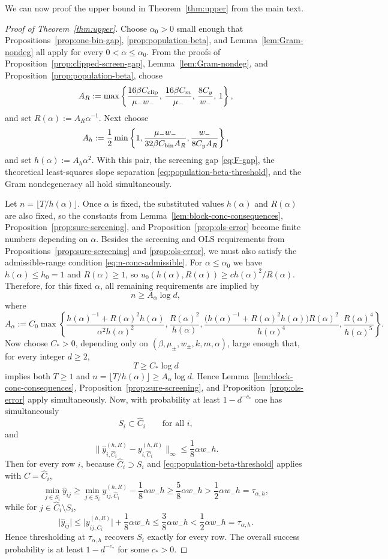 \documentclass{article}
\newcommand{\norm}[1]{\lVert #1\rVert}
\newcommand{\abs}[1]{\lvert #1\rvert}
\begin{document}
We can now proof the upper bound in Theorem~\ref{thm:upper} from the main text.
\begin{proof}[Proof of Theorem~\ref{thm:upper}]
Choose $\alpha_0>0$ small enough that Propositions~\ref{prop:one-bin-gap}, \ref{prop:population-beta}, and Lemma~\ref{lem:Gram-nondeg} all apply for every $0<\alpha\le \alpha_0$. From the proofs of Proposition~\ref{prop:clipped-screen-gap}, Lemma~\ref{lem:Gram-nondeg}, and Proposition~\ref{prop:population-beta}, choose
\[
A_R:=\max\left\{\frac{16\beta C_{\rm clip}}{\mu_-w_-},\,\frac{16\beta C_m}{\mu_-},\,\frac{8C_y}{w_-},\,1\right\},
\]
and set $R(\alpha):=A_R\alpha^{-1}$. Next choose
\[
A_h:=\frac12\min\left\{1,\frac{\mu_-w_-}{32\beta C_{\rm bin}A_R},\frac{w_-}{8C_yA_R}\right\},
\]
and set $h(\alpha):=A_h\alpha^2$. With this pair, the screening gap \eqref{eq:F-gap}, the theoretical least-squares slope separation \eqref{eq:population-beta-threshold}, and the Gram nondegeneracy all hold simultaneously.

Let $n=\lfloor T/h(\alpha)\rfloor$. Once $\alpha$ is fixed, the substituted values $h(\alpha)$ and $R(\alpha)$ are also fixed, so the constants from Lemma~\ref{lem:block-conc-consequences}, Proposition~\ref{prop:sure-screening}, and Proposition~\ref{prop:ols-error} become finite numbers depending on $\alpha$. Besides the screening and OLS requirements from Propositions~\ref{prop:sure-screening} and \ref{prop:ols-error}, we must also satisfy the admissible-range condition \eqref{eq:n-conc-admissible}. For $\alpha\le \alpha_0$ we have $h(\alpha)\le h_0=1$ and $R(\alpha)\ge 1$, so $u_0(h(\alpha),R(\alpha))\ge c h(\alpha)^2/R(\alpha)$. Therefore, for this fixed
\(\alpha\), all remaining requirements are implied by
\[
n\ge A_\alpha \log d,
\]
where
\[
A_\alpha
:=
C_0\max\left\{
\frac{h(\alpha)^{-1}+R(\alpha)^2 h(\alpha)}{\alpha^2 h(\alpha)^2},
\frac{R(\alpha)^2}{h(\alpha)},
\frac{\bigl(h(\alpha)^{-1}+R(\alpha)^2 h(\alpha)\bigr)R(\alpha)^2}{h(\alpha)^4},
\frac{R(\alpha)^4}{h(\alpha)^5}
\right\}.
\]
Now choose \(C_\ast>0\), depending only on
\((\beta,\mu_\pm,w_\pm,k,m,\alpha)\), large enough that, for every integer
\(d\ge2\),
\[
T\ge C_\ast\log d
\]
implies both \(T\ge1\) and $n=\lfloor T/h(\alpha)\rfloor\ge A_\alpha\log d$.
Hence Lemma~\ref{lem:block-conc-consequences},
Proposition~\ref{prop:sure-screening}, and Proposition~\ref{prop:ols-error}
apply simultaneously.
Now, with probability at least $1-d^{-c_*}$ one has simultaneously
\[
S_i\subset \widehat C_i\qquad\text{for all }i,
\]
and
\[
\norm{\widehat y_{i,\widehat C_i}^{(h,R)}-y_{i,\widehat C_i}^{(h,R)}}_\infty
\le \frac18 \alpha w_- h.
\]
Then for every row $i$, because $\widehat C_i\supset S_i$ and \eqref{eq:population-beta-threshold} applies with $C=\widehat C_i$,
\[
\min_{j\in S_i}\widehat y_{ij}
\ge
\min_{j\in S_i}y_{ij,\widehat C_i}^{(h,R)} - \frac18\alpha w_- h
\ge \frac58 \alpha w_- h > \frac12 \alpha w_- h = \tau_{\alpha,h},
\]
while for $j\in \widehat C_i\setminus S_i$,
\[
\abs{\widehat y_{ij}}
\le
\abs{y_{ij,\widehat C_i}^{(h,R)}} + \frac18\alpha w_- h
\le \frac38 \alpha w_- h < \frac12 \alpha w_- h = \tau_{\alpha,h}.
\]
Hence thresholding at $\tau_{\alpha,h}$ recovers $S_i$ exactly for every row. The overall success probability is at least $1-d^{-c_*}$ for some $c_*>0$.\qedhere
\end{proof}
\end{document}
